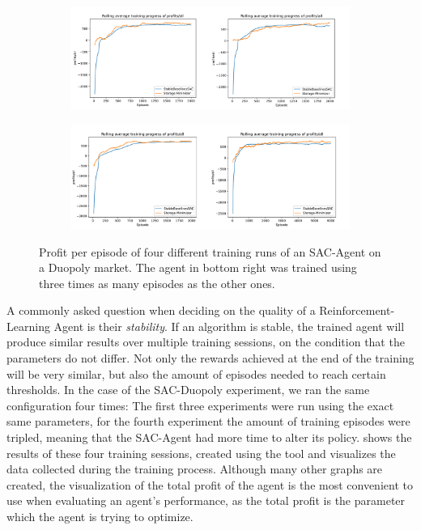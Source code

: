 \begin{figure}[!hbt]
	\begin{subfigure}{\textwidth}
		\centering
		\includegraphics[width = \textwidth]{images/experiments/SACDuopoly/SACDuopolyProfits1_2.pdf}\\[1 ex]
	\end{subfigure}
	\begin{subfigure}{\textwidth}
		\centering
		\includegraphics[width = \textwidth]{images/experiments/SACDuopoly/SACDuopolyProfits3_4.pdf}\\[1 ex]
	\end{subfigure}
	\caption{Profit per episode of four different training runs of an SAC-Agent on a Duopoly market. The agent in bottom right was trained using three times as many episodes as the other ones.}\label{fig:SACDuopolyProfitsMean}
\end{figure}

A commonly asked question when deciding on the quality of a Reinforcement-Learning Agent is their \emph{stability}. If an algorithm is stable, the trained agent will produce similar results over multiple training sessions, on the condition that the parameters do not differ. Not only the rewards achieved at the end of the training will be very similar, but also the amount of episodes needed to reach certain thresholds. In the case of the SAC-Duopoly experiment, we ran the same configuration four times: The first three experiments were run using the exact same parameters, for the fourth experiment the amount of training episodes were tripled, meaning that the SAC-Agent had more time to alter its policy.  shows the results of these four training sessions, created using the  tool and visualizes the data collected during the training process. Although many other graphs are created, the visualization of the total profit of the agent is the most convenient to use when evaluating an agent's performance, as the total profit is the parameter which the agent is trying to optimize.

